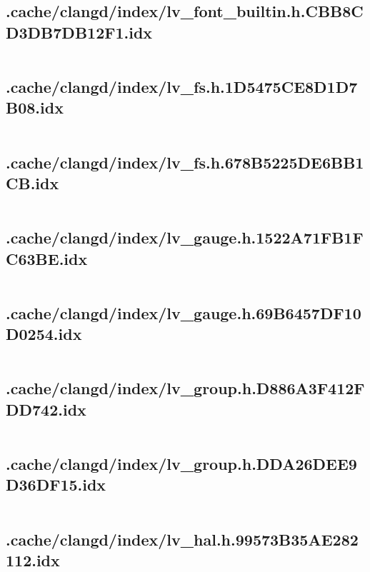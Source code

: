 \subsection{.cache/clangd/index/lv_font_builtin.h.CBB8CD3DB7DB12F1.idx}
\inputminted[linenos,tabsize=2,breaklines, breakanywhere]{c}{lv_font_builtin.h.CBB8CD3DB7DB12F1.idx}
\pagebreak

\subsection{.cache/clangd/index/lv_fs.h.1D5475CE8D1D7B08.idx}
\inputminted[linenos,tabsize=2,breaklines, breakanywhere]{c}{lv_fs.h.1D5475CE8D1D7B08.idx}
\pagebreak

\subsection{.cache/clangd/index/lv_fs.h.678B5225DE6BB1CB.idx}
\inputminted[linenos,tabsize=2,breaklines, breakanywhere]{c}{lv_fs.h.678B5225DE6BB1CB.idx}
\pagebreak

\subsection{.cache/clangd/index/lv_gauge.h.1522A71FB1FC63BE.idx}
\inputminted[linenos,tabsize=2,breaklines, breakanywhere]{c}{lv_gauge.h.1522A71FB1FC63BE.idx}
\pagebreak

\subsection{.cache/clangd/index/lv_gauge.h.69B6457DF10D0254.idx}
\inputminted[linenos,tabsize=2,breaklines, breakanywhere]{c}{lv_gauge.h.69B6457DF10D0254.idx}
\pagebreak

\subsection{.cache/clangd/index/lv_group.h.D886A3F412FDD742.idx}
\inputminted[linenos,tabsize=2,breaklines, breakanywhere]{c}{lv_group.h.D886A3F412FDD742.idx}
\pagebreak

\subsection{.cache/clangd/index/lv_group.h.DDA26DEE9D36DF15.idx}
\inputminted[linenos,tabsize=2,breaklines, breakanywhere]{c}{lv_group.h.DDA26DEE9D36DF15.idx}
\pagebreak

\subsection{.cache/clangd/index/lv_hal.h.99573B35AE282112.idx}
\inputminted[linenos,tabsize=2,breaklines, breakanywhere]{c}{lv_hal.h.99573B35AE282112.idx}
\pagebreak

